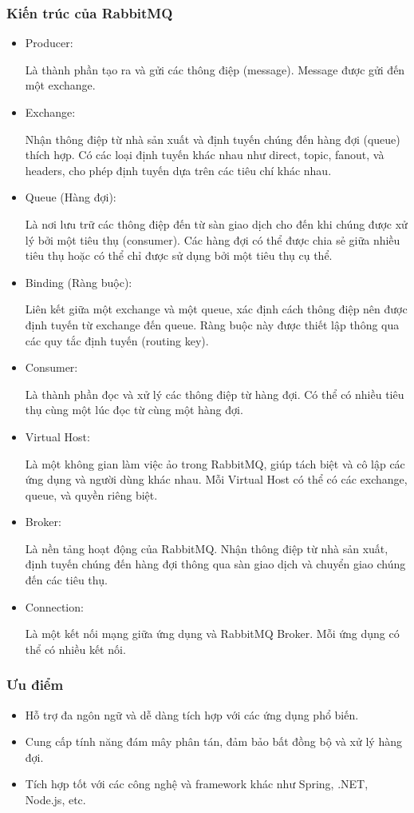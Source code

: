 \subsubsection{Kiến trúc của RabbitMQ}
\begin{itemize}
    \item Producer:

Là thành phần tạo ra và gửi các thông điệp (message).
Message được gửi đến một exchange.
    \item Exchange:

Nhận thông điệp từ nhà sản xuất và định tuyến chúng đến hàng đợi (queue) thích hợp.
Có các loại định tuyến khác nhau như direct, topic, fanout, và headers, cho phép định tuyến dựa trên các tiêu chí khác nhau.
    \item Queue (Hàng đợi):

Là nơi lưu trữ các thông điệp đến từ sàn giao dịch cho đến khi chúng được xử lý bởi một tiêu thụ (consumer).
Các hàng đợi có thể được chia sẻ giữa nhiều tiêu thụ hoặc có thể chỉ được sử dụng bởi một tiêu thụ cụ thể.
    \item Binding (Ràng buộc):

Liên kết giữa một exchange và một queue, xác định cách thông điệp nên được định tuyến từ exchange đến queue.
Ràng buộc này được thiết lập thông qua các quy tắc định tuyến (routing key).
    \item Consumer:

Là thành phần đọc và xử lý các thông điệp từ hàng đợi.
Có thể có nhiều tiêu thụ cùng một lúc đọc từ cùng một hàng đợi.
    \item Virtual Host:

Là một không gian làm việc ảo trong RabbitMQ, giúp tách biệt và cô lập các ứng dụng và người dùng khác nhau.
Mỗi Virtual Host có thể có các exchange, queue, và quyền riêng biệt.
    \item Broker:

Là nền tảng hoạt động của RabbitMQ.
Nhận thông điệp từ nhà sản xuất, định tuyến chúng đến hàng đợi thông qua sàn giao dịch và chuyển giao chúng đến các tiêu thụ.
    \item Connection:

Là một kết nối mạng giữa ứng dụng và RabbitMQ Broker.
Mỗi ứng dụng có thể có nhiều kết nối.
\end{itemize}

\subsubsection{Ưu điểm}
\begin{itemize}
    \item Hỗ trợ đa ngôn ngữ và dễ dàng tích hợp với các ứng dụng phổ biến.
    \item Cung cấp tính năng đám mây phân tán, đảm bảo bất đồng bộ và xử lý hàng đợi.
    \item Tích hợp tốt với các công nghệ và framework khác như Spring, .NET, Node.js, etc.
\end{itemize}
